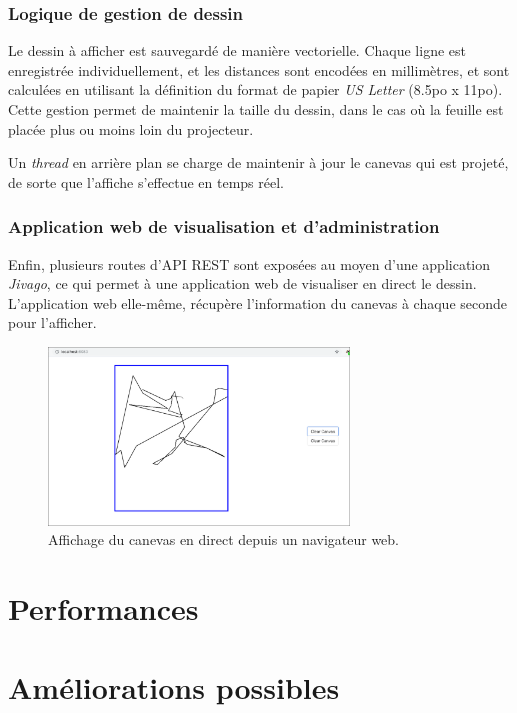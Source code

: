 \documentclass[11pt]{report}
\begin{document}

\subsubsection{Logique de gestion de dessin}

Le dessin à afficher est sauvegardé de manière vectorielle. Chaque ligne est
enregistrée individuellement, et les distances sont encodées en millimètres, et
sont calculées en utilisant la définition du format de papier \textit{US
  Letter} (8.5po x 11po). Cette gestion permet de maintenir la taille du dessin,
dans le cas où la feuille est placée plus ou moins loin du projecteur.

Un \textit{thread} en arrière plan se charge de maintenir à jour le canevas qui
est projeté, de sorte que l'affiche s'effectue en temps réel. 

\subsubsection{Application web de visualisation et d'administration}

Enfin, plusieurs routes d'API REST sont exposées au moyen d'une application
\textit{Jivago}, ce qui permet à une application web de visualiser en direct le
dessin. L'application web elle-même, récupère l'information du canevas à chaque
seconde pour l'afficher.

\begin{figure}
  \centering
  \includegraphics[width=8cm]{web-canvas.png}
  \caption{Affichage du canevas en direct depuis un navigateur web.}
  \label{web_ui}
  \end{figure}

\section{Performances}

\section{Améliorations possibles}
\end{document}
